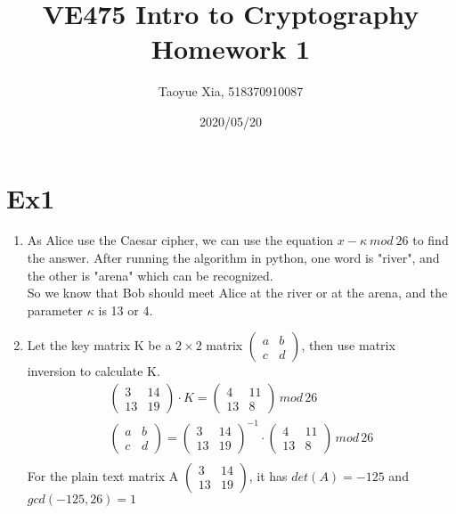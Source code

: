 \documentclass[12pt, a4paper]{article}
\begin{document}
\title{VE475 Intro to Cryptography Homework 1}
\author{Taoyue Xia, 518370910087}
\date{2020/05/20}
\maketitle

\section{Ex1}
\begin{enumerate}
\item As Alice use the Caesar cipher, we can use the equation $x-\kappa \  mod \  26$ to find the answer.
After running the algorithm in python, one word is "river", and the other is "arena" which can be recognized.\\
So we know that Bob should meet Alice at the river or at the arena, and the parameter $\kappa$ is 13 or 4.
\item Let the key matrix K be a $2\times 2$ matrix $\begin{pmatrix} a & b \\ c & d \end{pmatrix}$, 
then use matrix \\inversion to calculate K.\\
      \begin{equation*}
        \begin{split}
            \begin{pmatrix} 3 & 14 \\ 13 & 19 \end{pmatrix} \cdot K = \begin{pmatrix} 4 & 11 \\ 13 & 8 \end{pmatrix}\, mod\, 26\\
            \begin{pmatrix} a & b \\ c & d \end{pmatrix} = \begin{pmatrix} 3 & 14 \\ 13 & 19 \end{pmatrix}^{-1}
                \cdot \begin{pmatrix} 4 & 11 \\ 13 & 8 \end{pmatrix}\, mod\, 26\\
        \end{split}
      \end{equation*}  
      For the plain text matrix A $\begin{pmatrix} 3 & 14 \\ 13 & 19 \end{pmatrix}$, it has $det(A)=-125$ and $gcd(-125, 26) =1$\\

\end{enumerate}
\end{document}
